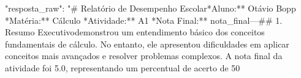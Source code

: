  "resposta_raw": "# Relatório de Desempenho Escolar\n\n**Aluno:** Otávio Bopp  \n**Matéria:** Cálculo  \n**Atividade:** A1  \n**Nota Final:** {{nota_final}}\n\n---\n\n## 1. Resumo Executivo\n{} demonstrou um entendimento básico dos conceitos fundamentais de cálculo. No entanto, ele apresentou dificuldades em aplicar conceitos mais avançados e resolver problemas complexos. A nota final da atividade foi 5.0, representando um percentual de acerto de 50%